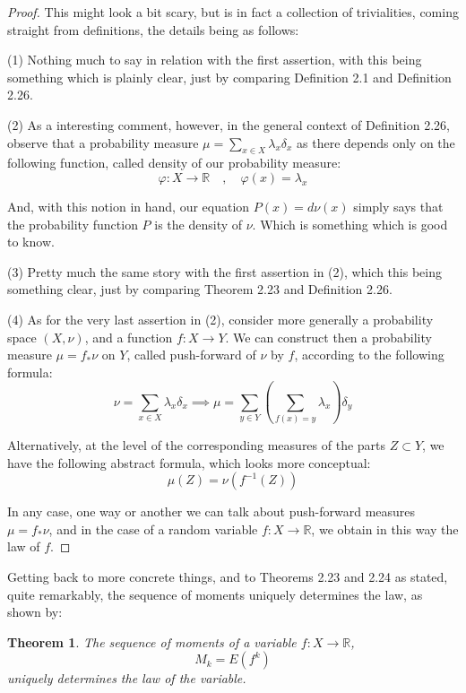 \documentclass[12pt]{amsbook}
\newtheorem{theorem}{Theorem}[chapter]
\begin{document}
\begin{proof}
This might look a bit scary, but is in fact a collection of trivialities, coming straight from definitions, the details being as follows:

\medskip

(1) Nothing much to say in relation with the first assertion, with this being something which is plainly clear, just by comparing Definition 2.1 and Definition 2.26. 

\medskip

(2) As a interesting comment, however, in the general context of Definition 2.26, observe that a probability measure $\mu=\sum_{x\in X}\lambda_x\delta_x$ as there depends only on the following function, called density of our probability measure:
$$\varphi:X\to\mathbb R\quad,\quad \varphi(x)=\lambda_x$$

And, with this notion in hand, our equation $P(x)=d\nu(x)$ simply says that the probability function $P$ is the density of $\nu$. Which is something which is good to know.

\medskip

(3) Pretty much the same story with the first assertion in (2), which this being something clear, just by comparing Theorem 2.23 and Definition 2.26. 

\medskip

(4) As for the very last assertion in (2), consider more generally a probability space $(X,\nu)$, and a function $f:X\to Y$. We can construct then a probability measure $\mu=f_*\nu$ on $Y$, called push-forward of $\nu$ by $f$, according to the following formula:
$$\nu=\sum_{x\in X}\lambda_x\delta_x\implies
\mu=\sum_{y\in Y}\left(\sum_{f(x)=y}\lambda_x\right)\delta_y$$

Alternatively, at the level of the corresponding measures of the parts $Z\subset Y$, we have the following abstract formula, which looks more conceptual:
$$\mu(Z)=\nu(f^{-1}(Z))$$

In any case, one way or another we can talk about push-forward measures $\mu=f_*\nu$, and in the case of a random variable $f:X\to\mathbb R$, we obtain in this way the law of $f$.
\end{proof}

Getting back to more concrete things, and to Theorems 2.23 and 2.24 as stated, quite remarkably, the sequence of moments uniquely determines the law, as shown by:

\begin{theorem}
The sequence of moments of a variable $f:X\to\mathbb R$,
$$M_k=E(f^k)$$
uniquely determines the law of the variable.
\end{theorem}
\end{document}
